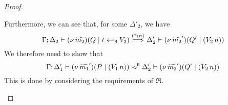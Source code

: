 \begin{proof}
\begin{enumerate}[$-$]
\begin{enumerate}[(a)]
\begin{enumerate}[i)]
$$							$$
							Furthermore, we can see that, for some $\Delta'_2$, we have
							\[
								\horel{\Gamma}{\Delta_2}{\newsp{\widetilde{m_2}}{Q \Par \htrigger{t}{V_2}  } }
								{\Hby{\bactinp{t}{n}}}
								{\Delta_2'}{\newsp{\widetilde{m_2}'}{Q' \Par (\appl{V_2}{n})}}
							\]
							We therefore need to show that
							\[
								\Gamma; \Delta_1' \vdash (\nu\, \widetilde{m_1}')(P \;|\; (V_1\, {n})) \approx^\mathtt{H} \Delta_2' \vdash (\nu\, \widetilde{m_2}')(Q' \;|\; (V_2\, {n}))
							\]
							This is done by considering the requirements of $\Re$.


\end{enumerate}
\end{enumerate}
\end{enumerate}
\end{proof}
